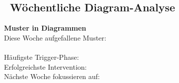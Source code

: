 \subsection*{\faCalendarCheck~Wöchentliche Diagram-Analyse}

\begin{ctmmBlueBox}{}
\textbf{Muster in Diagrammen}\\
Diese Woche aufgefallene Muster:\\
\\[0.3cm]
Häufigste Trigger-Phase:    \\[0.2cm]
Erfolgreichste Intervention: \\[0.2cm]
Nächste Woche fokussieren auf: 
\end{ctmmBlueBox}
